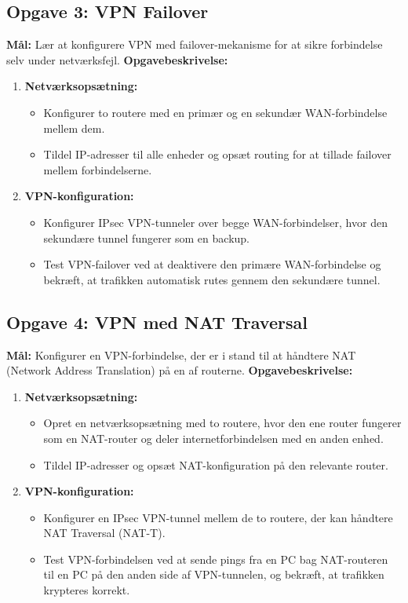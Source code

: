 \subsection*{Opgave 3: VPN Failover}
\textbf{Mål:} Lær at konfigurere VPN med failover-mekanisme for at sikre forbindelse selv under netværksfejl.
\newline\newline\noindent
\textbf{Opgavebeskrivelse:}
\begin{enumerate}
	\item \textbf{Netværksopsætning:}
	\begin{itemize}
		\item Konfigurer to routere med en primær og en sekundær WAN-forbindelse mellem dem.
		\item Tildel IP-adresser til alle enheder og opsæt routing for at tillade failover mellem forbindelserne.
	\end{itemize}
	
	\item \textbf{VPN-konfiguration:}
	\begin{itemize}
		\item Konfigurer IPsec VPN-tunneler over begge WAN-forbindelser, hvor den sekundære tunnel fungerer som en backup.
		\item Test VPN-failover ved at deaktivere den primære WAN-forbindelse og bekræft, at trafikken automatisk rutes gennem den sekundære tunnel.
	\end{itemize}
\end{enumerate}

\subsection*{Opgave 4: VPN med NAT Traversal}
\textbf{Mål:} Konfigurer en VPN-forbindelse, der er i stand til at håndtere NAT (Network Address Translation) på en af routerne.
\newline\newline\noindent
\textbf{Opgavebeskrivelse:}
\begin{enumerate}
	\item \textbf{Netværksopsætning:}
	\begin{itemize}
		\item Opret en netværksopsætning med to routere, hvor den ene router fungerer som en NAT-router og deler internetforbindelsen med en anden enhed.
		\item Tildel IP-adresser og opsæt NAT-konfiguration på den relevante router.
	\end{itemize}
	
	\item \textbf{VPN-konfiguration:}
	\begin{itemize}
		\item Konfigurer en IPsec VPN-tunnel mellem de to routere, der kan håndtere NAT Traversal (NAT-T).
		\item Test VPN-forbindelsen ved at sende pings fra en PC bag NAT-routeren til en PC på den anden side af VPN-tunnelen, og bekræft, at trafikken krypteres korrekt.
	\end{itemize}
\end{enumerate}

